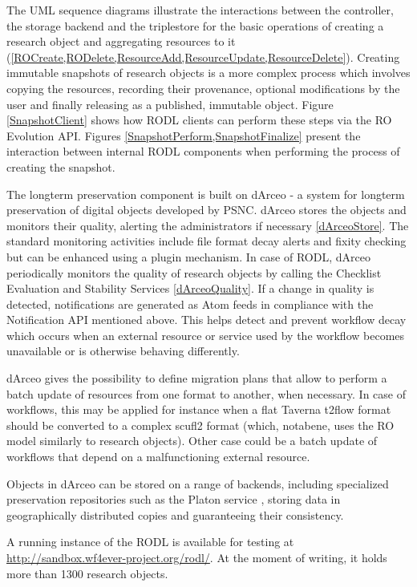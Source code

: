 The UML sequence diagrams illustrate the interactions between the controller, the storage backend and the triplestore for the basic operations of creating a research object and aggregating resources to it (\ref{ROCreate,RODelete,ResourceAdd,ResourceUpdate,ResourceDelete}). Creating immutable snapshots of research objects is a more complex process which involves copying the resources, recording their provenance, optional modifications by the user and finally releasing as a published, immutable object. Figure \ref{SnapshotClient} shows how RODL clients can perform these steps via the RO Evolution API. Figures \ref{SnapshotPerform,SnapshotFinalize} present the interaction between internal RODL components when performing the process of creating the snapshot.

The longterm preservation component is built on dArceo \cite{dArceo} - a system for longterm preservation of digital objects developed by PSNC. dArceo stores the objects and monitors their quality, alerting the administrators if necessary \ref{dArceoStore}. The standard monitoring activities include file format decay alerts and fixity checking but can be enhanced using a plugin mechanism. In case of RODL, dArceo periodically monitors the quality of research objects by calling the Checklist Evaluation and Stability Services \cite{Checklist-API,Stability-API} \ref{dArceoQuality}. If a change in quality is detected, notifications are generated as Atom feeds in compliance with the Notification API mentioned above. This helps detect and prevent workflow decay which occurs when an external resource or service used by the workflow becomes unavailable or is otherwise behaving differently.

dArceo gives the possibility to define migration plans that allow to perform a batch update of resources from one format to another, when necessary. In case of workflows, this may be applied for instance when a flat Taverna t2flow format should be converted to a complex scufl2 format (which, notabene, uses the RO model similarly to research objects). Other case could be a batch update of workflows that depend on a malfunctioning external resource.

Objects in dArceo can be stored on a range of backends, including specialized preservation repositories such as the Platon service \cite{Platon}, storing data in geographically distributed copies and guaranteeing their consistency.

A running instance of the RODL is available for testing at \url{http://sandbox.wf4ever-project.org/rodl/}. At the moment of writing, it holds more than 1300 research objects.


